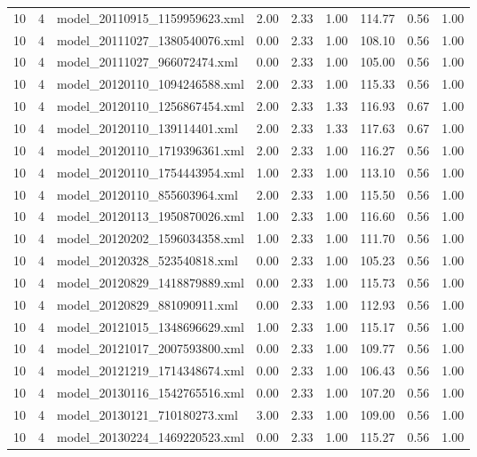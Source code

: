 \begin{table}[ht]
\begin{tabular}{rrlrrrrrr}
   10 &   4 & model\_20110915\_1159959623.xml & 2.00 & 2.33 & 1.00 & 114.77 & 0.56 & 1.00 \\ 
   10 &   4 & model\_20111027\_1380540076.xml & 0.00 & 2.33 & 1.00 & 108.10 & 0.56 & 1.00 \\ 
   10 &   4 & model\_20111027\_966072474.xml & 0.00 & 2.33 & 1.00 & 105.00 & 0.56 & 1.00 \\ 
   10 &   4 & model\_20120110\_1094246588.xml & 2.00 & 2.33 & 1.00 & 115.33 & 0.56 & 1.00 \\ 
   10 &   4 & model\_20120110\_1256867454.xml & 2.00 & 2.33 & 1.33 & 116.93 & 0.67 & 1.00 \\ 
   10 &   4 & model\_20120110\_139114401.xml & 2.00 & 2.33 & 1.33 & 117.63 & 0.67 & 1.00 \\ 
   10 &   4 & model\_20120110\_1719396361.xml & 2.00 & 2.33 & 1.00 & 116.27 & 0.56 & 1.00 \\ 
   10 &   4 & model\_20120110\_1754443954.xml & 1.00 & 2.33 & 1.00 & 113.10 & 0.56 & 1.00 \\ 
   10 &   4 & model\_20120110\_855603964.xml & 2.00 & 2.33 & 1.00 & 115.50 & 0.56 & 1.00 \\ 
   10 &   4 & model\_20120113\_1950870026.xml & 1.00 & 2.33 & 1.00 & 116.60 & 0.56 & 1.00 \\ 
   10 &   4 & model\_20120202\_1596034358.xml & 1.00 & 2.33 & 1.00 & 111.70 & 0.56 & 1.00 \\ 
   10 &   4 & model\_20120328\_523540818.xml & 0.00 & 2.33 & 1.00 & 105.23 & 0.56 & 1.00 \\ 
   10 &   4 & model\_20120829\_1418879889.xml & 0.00 & 2.33 & 1.00 & 115.73 & 0.56 & 1.00 \\ 
   10 &   4 & model\_20120829\_881090911.xml & 0.00 & 2.33 & 1.00 & 112.93 & 0.56 & 1.00 \\ 
   10 &   4 & model\_20121015\_1348696629.xml & 1.00 & 2.33 & 1.00 & 115.17 & 0.56 & 1.00 \\ 
   10 &   4 & model\_20121017\_2007593800.xml & 0.00 & 2.33 & 1.00 & 109.77 & 0.56 & 1.00 \\ 
   10 &   4 & model\_20121219\_1714348674.xml & 0.00 & 2.33 & 1.00 & 106.43 & 0.56 & 1.00 \\ 
   10 &   4 & model\_20130116\_1542765516.xml & 0.00 & 2.33 & 1.00 & 107.20 & 0.56 & 1.00 \\ 
   10 &   4 & model\_20130121\_710180273.xml & 3.00 & 2.33 & 1.00 & 109.00 & 0.56 & 1.00 \\ 
   10 &   4 & model\_20130224\_1469220523.xml & 0.00 & 2.33 & 1.00 & 115.27 & 0.56 & 1.00 \\ 

\end{tabular}
\end{table}
